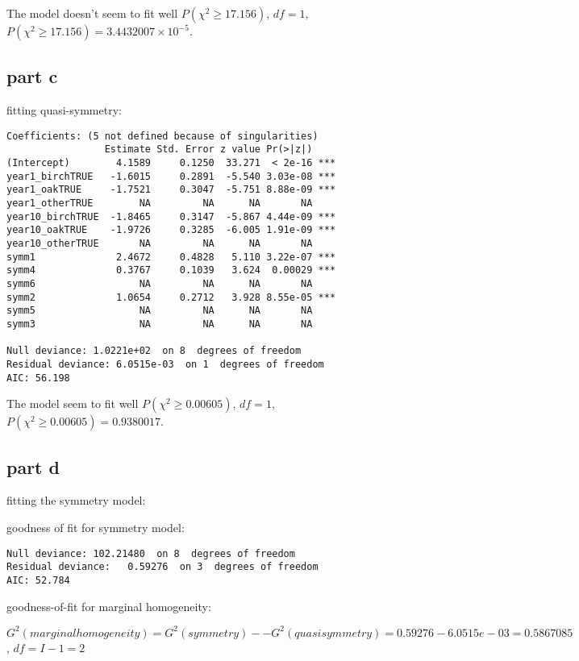 \documentclass[]{article}
\begin{document}
The model doesn't seem to fit well \(P(\chi^2 \ge 17.156)\), \(df=1\),
\(P(\chi^2 \ge 17.156) = 3.4432007\times 10^{-5}\).

\subsection{part c}\label{part-c}

fitting quasi-symmetry:

\begin{verbatim}
Coefficients: (5 not defined because of singularities)
                 Estimate Std. Error z value Pr(>|z|)    
(Intercept)        4.1589     0.1250  33.271  < 2e-16 ***
year1_birchTRUE   -1.6015     0.2891  -5.540 3.03e-08 ***
year1_oakTRUE     -1.7521     0.3047  -5.751 8.88e-09 ***
year1_otherTRUE        NA         NA      NA       NA    
year10_birchTRUE  -1.8465     0.3147  -5.867 4.44e-09 ***
year10_oakTRUE    -1.9726     0.3285  -6.005 1.91e-09 ***
year10_otherTRUE       NA         NA      NA       NA    
symm1              2.4672     0.4828   5.110 3.22e-07 ***
symm4              0.3767     0.1039   3.624  0.00029 ***
symm6                  NA         NA      NA       NA    
symm2              1.0654     0.2712   3.928 8.55e-05 ***
symm5                  NA         NA      NA       NA    
symm3                  NA         NA      NA       NA    

Null deviance: 1.0221e+02  on 8  degrees of freedom
Residual deviance: 6.0515e-03  on 1  degrees of freedom
AIC: 56.198
\end{verbatim}

The model seem to fit well \(P(\chi^2 \ge 0.00605)\), \(df=1\),
\(P(\chi^2 \ge 0.00605) = 0.9380017\).

\subsection{part d}\label{part-d}

fitting the symmetry model:

goodness of fit for symmetry model:

\begin{verbatim}
Null deviance: 102.21480  on 8  degrees of freedom
Residual deviance:   0.59276  on 3  degrees of freedom
AIC: 52.784
\end{verbatim}

goodness-of-fit for marginal homogeneity:

\(G^2(marginal homogeneity) = G^2(symmetry) -− G^2(quasi symmetry) = 0.59276 - 6.0515e-03 = 0.5867085\),
\(df=I-1=2\)
\end{document}
